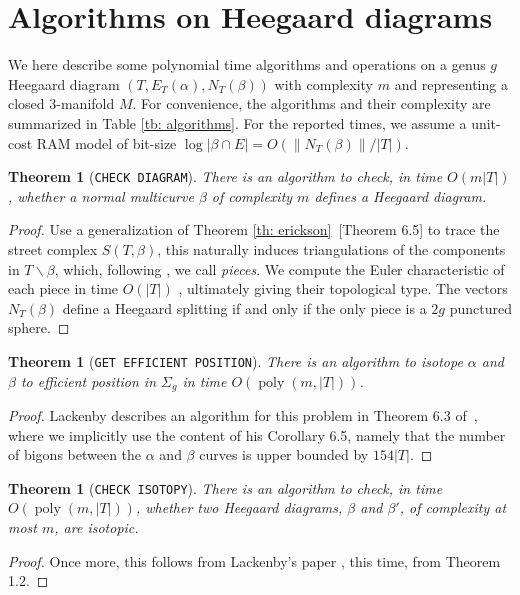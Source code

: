 \documentclass[11pt]{amsart}
\DeclareMathOperator{\poly}{poly}
\numberwithin{equation}{section}
\theoremstyle{plain}
\newtheorem{theorem}[equation]{Theorem}
\theoremstyle{definition}
\begin{document}
\section{Algorithms on Heegaard diagrams}\label{sec: algorithms}
We here describe some polynomial time algorithms and operations on a genus $g$ Heegaard diagram $(T, E_T(\alpha),N_T(\beta))$ with complexity $m$ and representing a closed 3-manifold $M$. 
For convenience, the algorithms and their complexity are summarized in Table \ref{tb: algorithms}.
For the reported times, we assume a unit-cost RAM model of bit-size $\log |\beta \cap E|=O(\|N_T(\beta)\|/|T|)$. 
\begin{theorem}[\texttt{CHECK DIAGRAM}]\label{th: check diagram}
    There is an algorithm to check, in time $O(m|T|)$, whether a normal multicurve $\beta$ of complexity $m$ defines a Heegaard diagram.
\end{theorem}
\begin{proof}
    Use a generalization of Theorem \ref{th: erickson}~\cite{erickson2002optimally}[Theorem 6.5] to trace the street complex $S(T,\beta)$, this naturally induces triangulations of the components in $T\backslash \beta$, which, following \cite{Erickson2013}, we call \textit{pieces}.
    We compute the Euler characteristic of each piece in time $O(|T|)$ \cite{erickson2002optimally}, ultimately giving their topological type. 
    The vectors $N_T(\beta)$ define a Heegaard splitting if and only if the only piece is a $2g$ punctured sphere.
\end{proof}

\begin{theorem}[\texttt{GET EFFICIENT POSITION}]\label{th: get efficient position}
    There is an algorithm to isotope $\alpha$ and $\beta$ to efficient position in $\Sigma_g$ in time $O(\poly(m,|T|))$. 
\end{theorem}
\begin{proof}
    Lackenby describes an algorithm for this problem in Theorem 6.3 of~\cite{lackenby2024some}, where we implicitly use the content of his Corollary 6.5, namely that the number of bigons between the $\alpha$ and $\beta$ curves is upper bounded by $154|T|$.
\end{proof}

\begin{theorem}[\texttt{CHECK ISOTOPY}]\label{th: check isotopy}
    There is an algorithm to check, in time $O(\poly(m,|T|))$, whether two Heegaard diagrams, $\beta$ and $\beta'$, of complexity at most $m$, are isotopic.
\end{theorem}
\begin{proof}
    Once more, this follows from Lackenby's paper \cite{lackenby2024some}, this time, from Theorem 1.2.
\end{proof}
\end{document}
